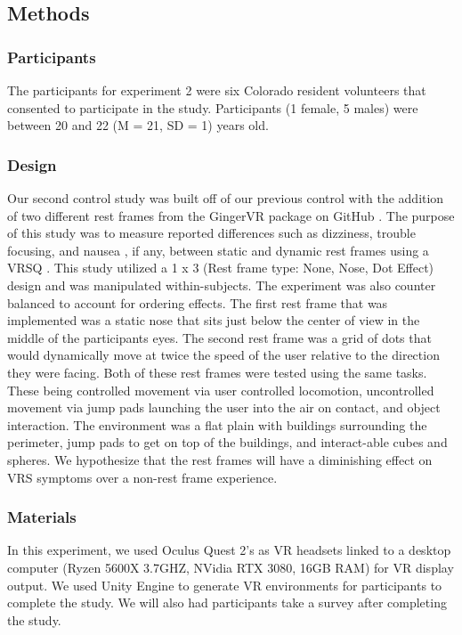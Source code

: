 \documentclass[sigconf]{acmart}
\begin{document}
\subsection{Methods}

\subsubsection{Participants}
The participants for experiment 2 were six Colorado resident volunteers that consented to participate in the study. Participants (1 female, 5 males) were between 20 and 22 (M = 21, SD = 1) years old.

\subsubsection{Design}
Our second control study was built off of our previous control with the addition of two different rest frames from the GingerVR package on GitHub \cite{ang}. The purpose of this study was to measure reported differences such as dizziness, trouble focusing, and nausea \cite{jung17, saredakis20, bockelman17}, if any, between static and dynamic rest frames using a VRSQ \cite{buhler18}. This study utilized a 1 x 3 (Rest frame type: None, Nose, Dot Effect) design and was manipulated within-subjects. The experiment was also counter balanced to account for ordering effects. The first rest frame that was implemented was a static nose that sits just below the center of view in the middle of the participants eyes. The second rest frame was a grid of dots that would dynamically move at twice the speed of the user relative to the direction they were facing. Both of these rest frames were tested using the same tasks. These being controlled movement via user controlled locomotion, uncontrolled movement via jump pads launching the user into the air on contact, and object interaction. The environment was a flat plain with buildings surrounding the perimeter, jump pads to get on top of the buildings, and interact-able cubes and spheres. We hypothesize that the rest frames will have a diminishing effect on VRS symptoms over a non-rest frame experience.

\subsubsection{Materials}
In this experiment, we used Oculus Quest 2’s as VR headsets linked to a desktop computer (Ryzen 5600X 3.7GHZ, NVidia RTX 3080, 16GB RAM) for VR display output. We used Unity Engine to generate VR environments for participants to complete the study. We will also had participants take a survey after completing the study.
\end{document}
